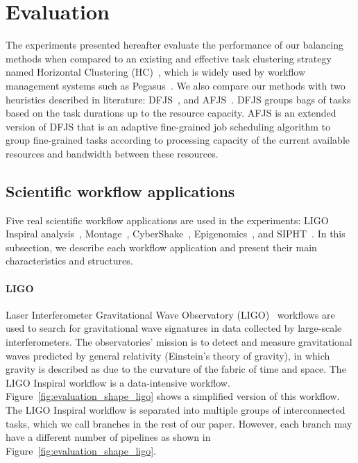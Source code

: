 \section{Evaluation}
\label{sec:experiments}

The experiments presented hereafter evaluate the performance of our balancing methods when compared to an existing and effective task clustering strategy named Horizontal Clustering (HC)~\cite{Singh:2008:WTC:1341811.1341822}, which is widely used by workflow management systems such as Pegasus~\cite{Deelman2004}. We also compare our methods with two heuristics described in literature: DFJS~\cite{Muthuvelu:2005:DJG:1082290.1082297}, and AFJS~\cite{Liu2009}. DFJS groups bags of tasks based on the task durations up to the resource capacity. AFJS is an extended version of DFJS that is an adaptive fine-grained job scheduling algorithm to group fine-grained tasks according to processing capacity of the current available resources and bandwidth between these resources.

\subsection{Scientific workflow applications}
\label{sec:applications}

Five real scientific workflow applications are used in the experiments: LIGO Inspiral analysis~\cite{LIGO}, Montage~\cite{Berriman2004}, CyberShake~\cite{Graves2010}, Epigenomics~\cite{Epigenome}, and SIPHT~\cite{SIPHT}. In this subsection, we describe each workflow application and present their main characteristics and structures.

\paragraph{\textbf{LIGO}}
Laser Interferometer Gravitational Wave Observatory (LIGO)~\cite{LIGO} workflows are used to search for gravitational wave signatures in data collected by large-scale interferometers. The observatories' mission is to detect and measure gravitational waves predicted by general relativity (Einstein's theory of gravity), in which gravity is described as due to the curvature of the fabric of time and space. The LIGO Inspiral workflow is a data-intensive workflow. Figure~\ref{fig:evaluation_shape_ligo} shows a simplified version of this workflow. The LIGO Inspiral workflow is separated into multiple groups of interconnected tasks, which we call branches in the rest of our paper. However, each branch may have a different number of pipelines as shown in Figure~\ref{fig:evaluation_shape_ligo}. 

